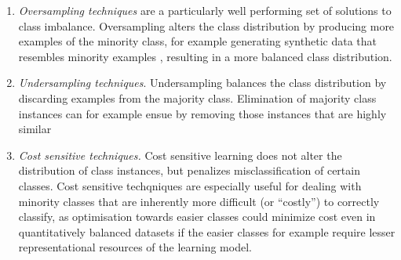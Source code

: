 \documentclass[twocolumn]{article}
\providecommand{\tightlist}{%
  \setlength{\itemsep}{0pt}\setlength{\parskip}{0pt}}
\begin{document}
\begin{enumerate}[noitemsep, topsep=0pt]
\def\labelenumi{\arabic{enumi}.}
\tightlist
\item
  \emph{Oversampling techniques} are a particularly well performing set
  of solutions to class imbalance. Oversampling alters the class
  distribution by producing more examples of the minority class, for
  example generating synthetic data that resembles minority examples
  \citep[e.g.][]{he2008adasyn, chawla2002smote}, resulting in a more
  balanced class distribution.
\item
  \emph{Undersampling techniques}. Undersampling balances the class
  distribution by discarding examples from the majority class.
  Elimination of majority class instances can for example ensue by
  removing those instances that are highly similar
  \citep[e.g.][]{tomek1976two}
\item
  \emph{Cost sensitive techniques.} Cost sensitive learning does not
  alter the distribution of class instances, but penalizes
  misclassification of certain classes. Cost sensitive techqniques are
  especially useful for dealing with minority classes that are
  inherently more difficult (or ``costly'') to correctly classify, as
  optimisation towards easier classes could minimize cost even in
  quantitatively balanced datasets if the easier classes for example
  require lesser representational resources of the learning model.
\end{enumerate}
\end{document}
